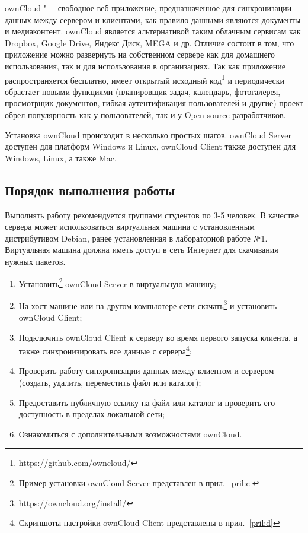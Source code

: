 ownCloud "--- свободное веб-приложение, предназначенное для синхронизации данных между сервером и клиентами, как правило данными являются документы и медиаконтент.
ownCloud является альтернативой таким облачным сервисам как Dropbox, Google Drive, Яндекс Диск, MEGA и др.
Отличие состоит в том, что приложение можно развернуть на собственном сервере как для домашнего использования, так и для использования в организациях.
Так как приложение распространяется бесплатно, имеет открытый исходный код\footnote{\url{https://github.com/owncloud/}} и периодически обрастает новыми функциями (планировщик задач, календарь, фотогалерея, просмотрщик документов, гибкая аутентификация пользователей и другие) проект обрел популярность как у пользователей, так и у Open-source разработчиков.

Установка ownCloud происходит в несколько простых шагов.
ownCloud Server доступен для платформ Windows и Linux, ownCloud Client также доступен для Windows, Linux, а также Mac.

\subsection{Порядок выполнения работы}

Выполнять работу рекомендуется группами студентов по 3-5 человек.
В качестве сервера может использоваться виртуальная машина с установленным дистрибутивом Debian, ранее установленная в лабораторной работе №1.
Виртуальная машина должна иметь доступ в сеть Интернет для скачивания нужных пакетов.

\begin{enumerate}
    \item Установить\footnote{Пример установки ownCloud Server представлен в прил.~\ref{pril:c}} ownCloud Server в виртуальную машину;
    \item На хост-машине или на другом компьютере сети скачать\footnote{\url{https://owncloud.org/install/}} и установить ownCloud Client;
    \item Подключить ownCloud Client к серверу во время первого запуска клиента, а также синхронизировать все данные с сервера\footnote{Скриншоты настройки ownCloud Client представлены в прил.~\ref{pril:d}};
    \item Проверить работу синхронизации данных между клиентом и сервером (создать, удалить, переместить файл или каталог);
    \item Предоставить публичную ссылку на файл или каталог и проверить его доступность в пределах локальной сети;
    \item Ознакомиться с дополнительными возможностями ownCloud.
\end{enumerate}

